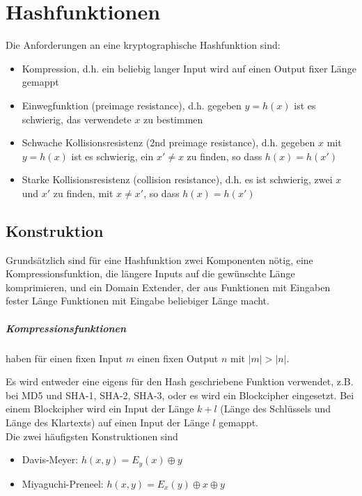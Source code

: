 \chapter{Hashfunktionen}

Die Anforderungen an eine kryptographische Hashfunktion sind:
\begin{itemize}
    \item Kompression, d.h. ein beliebig langer Input wird auf einen Output fixer Länge gemappt
    \item Einwegfunktion (preimage resistance), d.h. gegeben $y = h(x)$ ist es schwierig, das verwendete $x$ zu bestimmen
    \item Schwache Kollisionsresistenz (2nd preimage resistance), d.h. gegeben $x$ mit $y = h(x)$ ist es schwierig, ein $x' \neq x$ zu finden, so dass $h(x) = h(x')$
    \item Starke Kollisionsresistenz (collision resistance), d.h. es ist schwierig, zwei $x$ und $x'$ zu finden, mit $x \neq x'$, so dass $h(x) = h(x')$
\end{itemize}

\section{Konstruktion}

Grundsätzlich sind für eine Hashfunktion zwei Komponenten nötig, eine Kompressionsfunktion, die längere Inputs auf die gewünschte Länge komprimieren, und ein Domain 
Extender, der aus Funktionen mit Eingaben fester Länge Funktionen mit Eingabe beliebiger Länge macht.

\paragraph{Kompressionsfunktionen} haben für einen fixen Input $m$ einen fixen Output $n$ mit 
$|m| > |n|$.

Es wird entweder eine eigens für den Hash geschriebene Funktion verwendet, z.B. bei MD5 und SHA-1, SHA-2, SHA-3, oder es wird ein Blockcipher eingesetzt. Bei einem 
Blockcipher wird ein Input der Länge $k+l$ (Länge des Schlüssels und Länge des Klartexts) auf einen Input der Länge $l$ gemappt. \\

Die zwei häufigsten Konstruktionen sind
\begin{itemize}
    \item Davis-Meyer: $h(x, y) = E_y(x) \oplus y$
    \item Miyaguchi-Preneel: $h(x, y) = E_x(y) \oplus x \oplus y$
\end{itemize}



